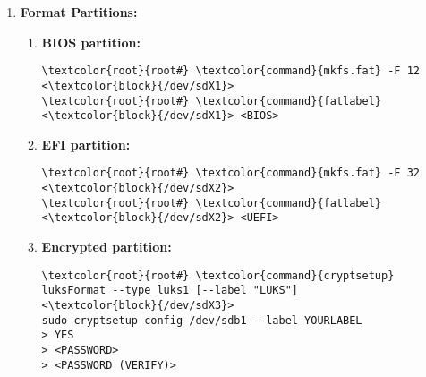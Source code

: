 \documentclass[10pt, a4paper, onecolumn, openany]{book} %
\begin{document}
\begin{enumerate}
\begin{enumerate}
\begin{Verbatim}[commandchars=\\\{\}]
\textcolor{root}{cfdisk>} \textcolor{command}{W}
\textcolor{root}{cfdisk>} \textcolor{command}{yes}
\end{Verbatim}
        \item \textbf{Quit cfdisk:}
\begin{Verbatim}[commandchars=\\\{\}]
\textcolor{root}{cfdisk>} \textcolor{command}{Q}
\end{Verbatim}
        \item \textbf{Name partitions:}
\begin{Verbatim}[commandchars=\\\{\}]
\textcolor{root}{root#} \textcolor{command}{parted} -s <\textcolor{block}{/dev/sdX}> name 1 BIOS
\textcolor{root}{root#} \textcolor{command}{parted} -s <\textcolor{block}{/dev/sdX}> name 2 UEFI
\textcolor{root}{root#} \textcolor{command}{parted} -s <\textcolor{block}{/dev/sdX}> name 3 LUKS
\end{Verbatim}
    \end{enumerate}
    
    \item \textbf{Format Partitions:}
        \begin{enumerate}
            \item \textbf{BIOS partition:}
\begin{Verbatim}[commandchars=\\\{\}]
\textcolor{root}{root#} \textcolor{command}{mkfs.fat} -F 12 <\textcolor{block}{/dev/sdX1}>
\textcolor{root}{root#} \textcolor{command}{fatlabel} <\textcolor{block}{/dev/sdX1}> <BIOS>
\end{Verbatim}            
            \item \textbf{EFI partition:}
\begin{Verbatim}[commandchars=\\\{\}]
\textcolor{root}{root#} \textcolor{command}{mkfs.fat} -F 32 <\textcolor{block}{/dev/sdX2}>
\textcolor{root}{root#} \textcolor{command}{fatlabel} <\textcolor{block}{/dev/sdX2}> <UEFI>
\end{Verbatim}                
            \item \textbf{Encrypted partition:}
\begin{Verbatim}[commandchars=\\\{\}]
\textcolor{root}{root#} \textcolor{command}{cryptsetup} luksFormat --type luks1 [--label "LUKS"] 
<\textcolor{block}{/dev/sdX3}>
sudo cryptsetup config /dev/sdb1 --label YOURLABEL
> YES
> <PASSWORD>
> <PASSWORD (VERIFY)>
\end{Verbatim}
        \end{enumerate}


\end{enumerate}
\end{document}
